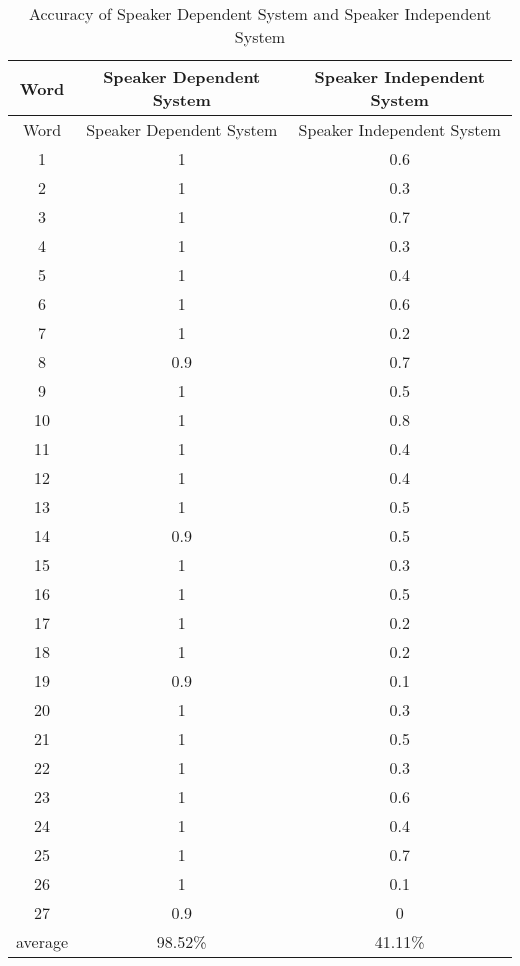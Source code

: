 \begin{longtable}[c]{|c|c|c|}
\caption {Accuracy of Speaker Dependent System and Speaker Independent System\label{table 3}}\\

\hline
Word & Speaker Dependent System  & Speaker Independent System \\
\hline
\endfirsthead

\hline
Word & Speaker Dependent System  & Speaker Independent System \\
\hline
\endhead

\hline
\endfoot

\hline
\endlastfoot

1& 1 & 0.6\\
\hline
2& 1 &  0.3\\
\hline
3& 1&  0.7\\
\hline
4& 1& 0.3\\
\hline
5& 1& 0.4\\
\hline
6& 1 &  0.6 \\
\hline
7& 1 &   0.2\\
\hline
8& 0.9 &   0.7\\
\hline
9&1 &   0.5\\
\hline
10&1 &  0.8\\
\hline
11& 1 &  0.4\\
\hline
12& 1 &   0.4\\
\hline
13& 1 &   0.5\\
\hline
14& 0.9 & 0.5\\
\hline
15& 1 &  0.3 \\
\hline
16& 1 &  0.5 \\
\hline
17& 1 &  0.2\\
\hline
18& 1 &   0.2\\
\hline
19&0.9& 0.1\\
\hline
20&1 &   0.3\\
\hline
21&1 &  0.5\\
\hline
22& 1 &  0.3\\
\hline
23& 1 &  0.6\\
\hline
24& 1 &   0.4\\
\hline
25& 1 &   0.7\\
\hline
26& 1 &  0.1\\
\hline
27& 0.9 &  0\\
\hline
average & 98.52\% & 41.11\% \\
\end{longtable}


